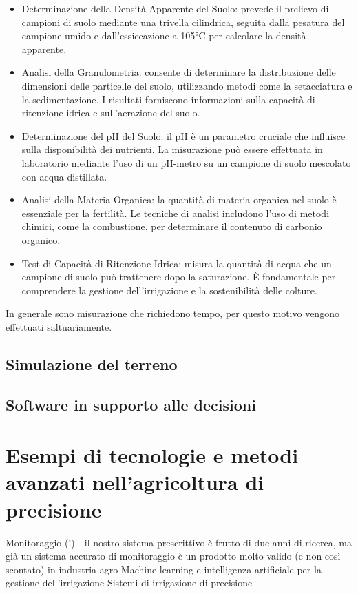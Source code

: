 \documentclass[12pt,a4paper,openright,twoside]{book}
\begin{document}
\begin{itemize}[noitemsep]
    \item Determinazione della Densità Apparente del Suolo: prevede il prelievo di campioni di suolo mediante una trivella cilindrica, seguita dalla pesatura del campione umido e dall'essiccazione a 105°C per calcolare la densità apparente\cite{BULK-DENSITY}.
    \item Analisi della Granulometria: consente di determinare la distribuzione delle dimensioni delle particelle del suolo, utilizzando metodi come la setacciatura e la sedimentazione. I risultati forniscono informazioni sulla capacità di ritenzione idrica e sull'aerazione del suolo\cite{GRANUMETRIC-ANALYSIS}.
    \item Determinazione del pH del Suolo: il pH è un parametro cruciale che influisce sulla disponibilità dei nutrienti. La misurazione può essere effettuata in laboratorio mediante l'uso di un pH-metro su un campione di suolo mescolato con acqua distillata\cite{PH-SOIL}.
    \item Analisi della Materia Organica: la quantità di materia organica nel suolo è essenziale per la fertilità. Le tecniche di analisi includono l'uso di metodi chimici, come la combustione, per determinare il contenuto di carbonio organico\cite{ORGANIC-SOIL}.
    \item Test di Capacità di Ritenzione Idrica: misura la quantità di acqua che un campione di suolo può trattenere dopo la saturazione. È fondamentale per comprendere la gestione dell'irrigazione e la sostenibilità delle colture\cite{WATER-RETENTION-LAB}.
\end{itemize}

In generale sono misurazione che richiedono tempo, per questo motivo vengono effettuati saltuariamente.

\subsection{Simulazione del terreno}

\subsection{Software in supporto alle decisioni}


\section{Esempi di tecnologie e metodi avanzati nell’agricoltura di precisione}
\label{esempi-tecnologie}
Monitoraggio (!) - il nostro sistema prescrittivo è frutto di due anni di ricerca, ma già un sistema accurato di monitoraggio è un prodotto molto valido (e non così scontato) in industria agro
Machine learning e intelligenza artificiale per la gestione dell'irrigazione
Sistemi di irrigazione di precisione
\end{document}
